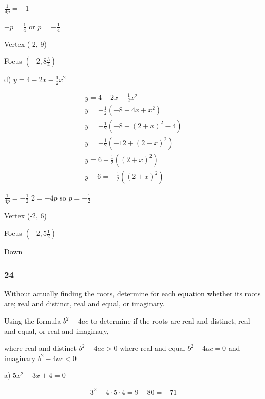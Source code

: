 \documentclass[]{report}
\begin{document}
$\frac{1}{4p}  = -1$

$-p = \frac{1}{4}$ or $p = -\frac{1}{4}$

Vertex (-2, 9)

Focus $(-2,  8\frac{3}{4})$


d) $y = 4 - 2x - \frac{1}{2} x^2$

\begin{align*}
y = 4 - 2x - \frac{1}{2} x^2 \tag{1} \\
y = -\frac{1}{2}(-8 + 4x + x^2) \\
y = -\frac{1}{2}(-8 + (2 + x)^2 - 4) \tag{completing the square} \\
y = -\frac{1}{2}(-12 + (2 + x)^2) \\
y = 6 -\frac{1}{2}((2 + x)^2)\\
y - 6 = -\frac{1}{2}((2 + x)^2)
\end{align*}

$\frac{1}{4p} = -\frac{1}{2}$
$2 = -4p$ so $p = -\frac{1}{2}$

Vertex (-2, 6)

Focus $(-2, 5\frac{1}{2})$

Down


\subsubsection{24}
Without actually finding the roots, determine for each equation whether its roots are; real and distinct, real and equal, or imaginary.

Using the formula $b^2 - 4ac$ to determine if the roots are real and distinct, real and equal, or real and imaginary,

where real and distinct $b^2 - 4ac > 0$
where real and equal $b^2 - 4ac = 0$
and imaginary $b^2 - 4ac < 0$

a) $5x^2 +3x + 4 = 0$

\[
3^2 - 4\cdot5\cdot4 = 9 - 80 = -71
\]
\end{document}
